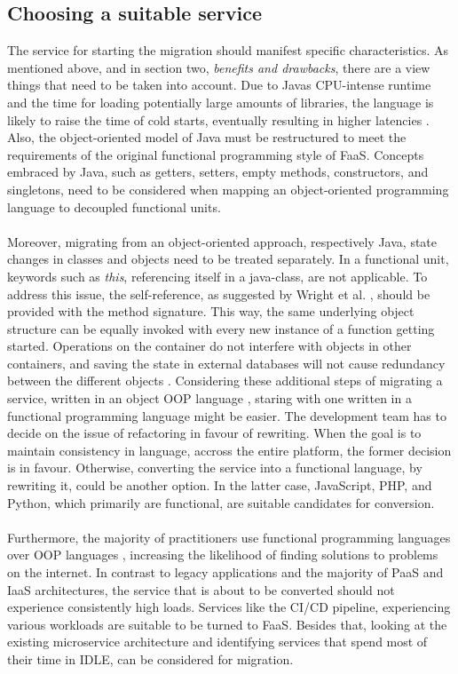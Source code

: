 \documentclass[11pt]{article}
\begin{document}
\subsection{Choosing a suitable service}
The service for starting the migration should manifest specific characteristics. As mentioned above, and in section two, \textit{benefits and drawbacks}, there are a view things that need to be taken into account. Due to Javas CPU-intense runtime and the time for loading potentially large amounts of libraries, the language is likely to raise the time of cold starts, eventually resulting in higher latencies \cite{bardsley2018serverless}. Also, the object-oriented model of Java must be restructured to meet the requirements of the original functional programming style of FaaS. Concepts embraced by Java, such as getters, setters, empty methods, constructors, and singletons, need to be considered when mapping an object-oriented programming language to decoupled functional units. \\\\
Moreover, migrating from an object-oriented approach, respectively Java, state changes in classes and objects need to be treated separately. In a functional unit, keywords such as \textit{this}, referencing itself in a java-class, are not applicable. To address this issue, the self-reference, as suggested by Wright et al. \cite{wright1998compiling}, should be provided with the method signature. This way, the same underlying object structure can be equally invoked with every new instance of a function getting started. Operations on the container do not interfere with objects in other containers, and saving the state in external databases will not cause redundancy between the different objects \cite{spillner2017java}. Considering these additional steps of migrating a service, written in an object OOP language \cite{leitner2019mixed}, staring with one written in a functional programming language might be easier. The development team has to decide on the issue of refactoring in favour of rewriting. When the goal is to maintain consistency in language, accross the entire platform, the former decision is in favour. Otherwise, converting the service into a functional language, by rewriting it, could be another option. In the latter case, JavaScript, PHP, and Python, which primarily are functional, are suitable candidates for conversion.\\\\
Furthermore, the majority of practitioners use functional programming languages over OOP languages \cite{leitner2019mixed}, increasing the likelihood of finding solutions to problems on the internet. In contrast to legacy applications and the majority of PaaS and IaaS architectures, the service that is about to be converted should not experience consistently high loads. Services like the CI/CD pipeline, experiencing various workloads are suitable to be turned to FaaS. Besides that, looking at the existing microservice architecture and identifying services that spend most of their time in IDLE, can be considered for migration.
\end{document}
